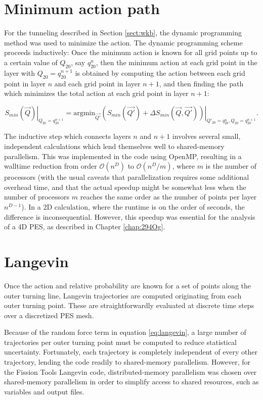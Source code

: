 \section{Minimum action path}
For the tunneling described in Section \ref{sect:wkb}, the dynamic programming method \cite{Baran1981} was used to minimize the action. The dynamic programming scheme proceeds inductively: Once the minimum action is known for all grid points up to a certain value of $Q_{20}$, say $q_{20}^n$, then the minimum action at each grid point in the layer with $Q_{20}=q_{20}^{n+1}$ is obtained by computing the action between each grid point in layer $n$ and each grid point in layer $n+1$, and then finding the path which minimizes the total action at each grid point in layer $n+1$:

\begin{equation}
\left.S_{min}(\vec{Q})\right|_{Q_{20}=q_{20}^{n+1}} = \mathrm{argmin}_{\vec{Q'}}\left.\left(S_{min}(\vec{Q'}) + \Delta S_{min}(\vec{Q},\vec{Q'})\right)\right|_{Q'_{20}=q_{20}^{n}, Q_{20}=q_{20}^{n+1}}.
\end{equation}

The inductive step which connects layers $n$ and $n+1$ involves several small, independent calculations which lend themselves well to shared-memory parallelism. This was implemented in the code using OpenMP, resulting in a walltime reduction from order $\mathcal{O}(n^D)$ to $\mathcal{O}(n^D/m)$, where $m$ is the number of processors (with the usual caveats that parallelization requires some additional overhead time, and that the actual speedup might be somewhat less when the number of processors $m$ reaches the same order as the number of points per layer $n^{D-1}$). In a 2D calculation, where the runtime is on the order of seconds, the difference is inconsequential. However, this speedup was essential for the analysis of a 4D PES, as described in Chapter \ref{chap:294Og}.


\section{Langevin}
Once the action and relative probability are known for a set of points along the outer turning line, Langevin trajectories are computed originating from each outer turning point. These are straightforwardly evaluated at discrete time steps over a discretized PES mesh.

Because of the random force term in equation \eqref{eq:langevin}, a large number of trajectories per outer turning point must be computed to reduce statistical uncertainty. Fortunately, each trajectory is completely independent of every other trajectory, lending the code readily to shared-memory parallelism. However, for the Fission Tools Langevin code, distributed-memory parallelism was chosen over shared-memory parallelism in order to simplify access to shared resources, such as variables and output files.